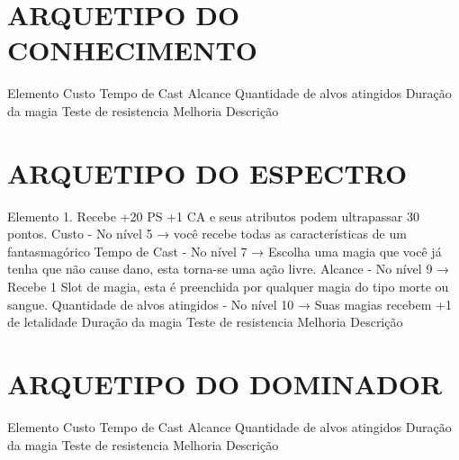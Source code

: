 \documentclass{article}%
\begin{document}
%
\section{ARQUETIPO DO CONHECIMENTO}%
\label{sec:ARQUETIPODOCONHECIMENTO}%
Elemento \newline%
Custo \newline%
Tempo de Cast \newline%
Alcance \newline%
Quantidade de alvos atingidos \newline%
Duração da magia \newline%
Teste de resistencia \newline%
Melhoria \newline%
Descrição \newline%

%
\section{ARQUETIPO DO ESPECTRO}%
\label{sec:ARQUETIPODOESPECTRO}%
Elemento 1. Recebe +20 PS +1 CA e seus atributos podem ultrapassar 30 pontos.\newline%
Custo {-} No nível 5 → você recebe todas as características de um fantasmagórico\newline%
Tempo de Cast {-} No nível 7 → Escolha uma magia que você já tenha que não cause dano, esta torna{-}se uma ação livre.\newline%
Alcance {-} No nível 9 → Recebe 1 Slot de magia, esta é preenchida por qualquer magia do tipo morte ou sangue.\newline%
Quantidade de alvos atingidos {-} No nível 10 → Suas magias recebem +1 de letalidade\newline%
Duração da magia \newline%
Teste de resistencia \newline%
Melhoria \newline%
Descrição \newline%

%
\section{ARQUETIPO DO DOMINADOR}%
\label{sec:ARQUETIPODODOMINADOR}%
Elemento \newline%
Custo \newline%
Tempo de Cast \newline%
Alcance \newline%
Quantidade de alvos atingidos \newline%
Duração da magia \newline%
Teste de resistencia \newline%
Melhoria \newline%
Descrição \newline%
\end{document}
